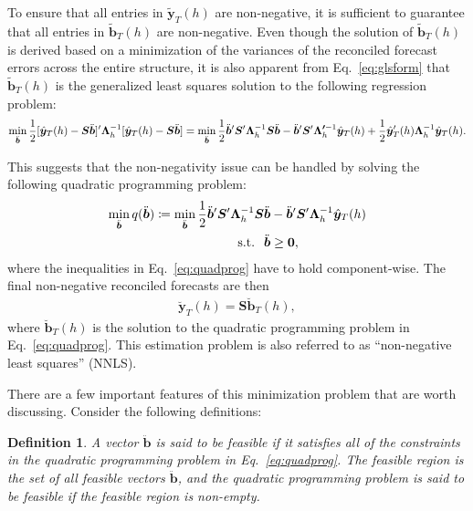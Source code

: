 \documentclass[11pt]{article}
\newcommand{\0}{\phantom{0}}
\newtheorem{definition}{Definition}[section]
\begin{document}
To ensure that all entries in $\tilde{\bm{y}}_{T}(h)$ are non-negative, it is sufficient to guarantee that all entries in $\tilde{\bm{b}}_{T}(h)$ are non-negative. Even though the solution of $\tilde{\bm{b}}_{T}(h)$ is derived based on a minimization of the variances of the reconciled forecast errors across the entire structure, it is also apparent from Eq.\ \eqref{eq:glsform} that $\tilde{\bm{b}}_{T}(h)$ is the generalized least squares solution to the following regression problem:
\begin{align*}
\operatornamewithlimits{min}_{\ddot{\bm{b}}} \frac{1}{2}[\hat{\bm{y}}_{T}(h) - \bm{S}\ddot{\bm{b}}]'\bm{\Lambda}^{-1}_{h}[\hat{\bm{y}}_{T}(h) - \bm{S}\ddot{\bm{b}}] =  \operatornamewithlimits{min}_{\ddot{\bm{b}}} \frac{1}{2}\ddot{\bm{b}}'\bm{S}'\bm{\Lambda}^{-1}_{h}\bm{S}\ddot{\bm{b}} - \ddot{\bm{b}}'\bm{S}'\bm{\Lambda'}^{-1}_{h}\hat{\bm{y}}_{T}(h) +  \frac{1}{2}\hat{\bm{y}}_{T}'(h) \bm{\Lambda}_{h}^{-1}\hat{\bm{y}}_{T}(h).
\end{align*}

This suggests that the non-negativity issue can be handled by solving the following quadratic programming problem:
\begin{align}
\label{eq:quadprog}
\operatornamewithlimits{min}_{\ddot{\bm{b}}} q(\ddot{\bm{b}}) \coloneqq \operatornamewithlimits{min}_{\ddot{\bm{b}}} \frac{1}{2}\ddot{\bm{b}}'\bm{S}'\bm{\Lambda}^{-1}_{h}\bm{S}\ddot{\bm{b}} & - \ddot{\bm{b}}'\bm{S}'\bm{\Lambda}^{-1}_{h}\hat{\bm{y}}_{T}(h) \nonumber\\
\text{s.t.} \hspace*{2.5mm} \ddot{\bm{b}} & \geq \bm{0},
\end{align}
where the inequalities in Eq.\ \eqref{eq:quadprog} have to hold component-wise. The final non-negative reconciled forecasts are then
\begin{align*}
\breve{\bm{y}}_{T}(h) = \bm{S}\breve{\bm{b}}_{T}(h),
\end{align*}
where $\breve{\bm{b}}_{T}(h)$ is the solution to the quadratic programming problem in Eq.\ \eqref{eq:quadprog}. This estimation problem is also referred to as ``non-negative least squares'' (NNLS).

There are a few important features of this minimization problem that are worth discussing. Consider the following definitions:

\begin{definition}
	A vector $\ddot{\bm{b}}$ is said to be feasible if it satisfies all of the constraints in the quadratic programming problem in Eq.\ \eqref{eq:quadprog}. The feasible region is the set of all feasible vectors $\ddot{\bm{b}}$, and the quadratic programming problem is said to be feasible if the feasible region is non-empty.
\end{definition} 
\end{document}
